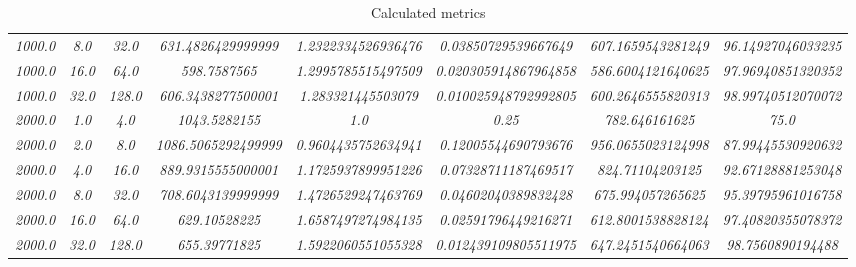 \documentclass[../main.tex]{subfiles}
\begin{document}
\begin{table}[]
\begin{tabular}{|c|c|c|c|c|c|c|c|}
\textit{1000.0} & \textit{8.0}        & \textit{32.0}  & \textit{631.4826429999999}  & \textit{1.2322334526936476}  & \textit{0.03850729539667649}   & \textit{607.1659543281249}  & \textit{96.14927046033235} \\
\textit{1000.0} & \textit{16.0}       & \textit{64.0}  & \textit{598.7587565}        & \textit{1.2995785515497509}  & \textit{0.020305914867964858}  & \textit{586.6004121640625}  & \textit{97.96940851320352} \\
\textit{1000.0} & \textit{32.0}       & \textit{128.0} & \textit{606.3438277500001}  & \textit{1.283321445503079}   & \textit{0.010025948792992805}  & \textit{600.2646555820313}  & \textit{98.99740512070072} \\
\textit{2000.0} & \textit{1.0}        & \textit{4.0}   & \textit{1043.5282155}       & \textit{1.0}                 & \textit{0.25}                  & \textit{782.646161625}      & \textit{75.0}              \\
\textit{2000.0} & \textit{2.0}        & \textit{8.0}   & \textit{1086.5065292499999} & \textit{0.9604435752634941}  & \textit{0.12005544690793676}   & \textit{956.0655023124998}  & \textit{87.99445530920632} \\
\textit{2000.0} & \textit{4.0}        & \textit{16.0}  & \textit{889.9315555000001}  & \textit{1.1725937899951226}  & \textit{0.07328711187469517}   & \textit{824.71104203125}    & \textit{92.67128881253048} \\
\textit{2000.0} & \textit{8.0}        & \textit{32.0}  & \textit{708.6043139999999}  & \textit{1.4726529247463769}  & \textit{0.04602040389832428}   & \textit{675.994057265625}   & \textit{95.39795961016758} \\
\textit{2000.0} & \textit{16.0}       & \textit{64.0}  & \textit{629.10528225}       & \textit{1.6587497274984135}  & \textit{0.02591796449216271}   & \textit{612.8001538828124}  & \textit{97.40820355078372} \\
\textit{2000.0} & \textit{32.0}       & \textit{128.0} & \textit{655.39771825}       & \textit{1.5922060551055328}  & \textit{0.012439109805511975}  & \textit{647.2451540664063}  & \textit{98.7560890194488}  \\ \hline
\end{tabular}
\caption{Calculated metrics}
\end{table}
\end{document}

